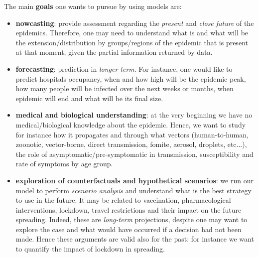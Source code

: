 \documentclass[../main/main.tex]{subfiles}
\begin{document}
The main \textbf{goals} one wants to pursue by using models are:
\begin{itemize}
    \item \textbf{nowcasting}: provide assessment regarding the \textit{present} and \textit{close future} of the epidemics. Therefore, one may need to understand what is and what will be the extension/distribution by groups/regions of the epidemic that is present at that moment, given the partial information returned by data.
    \item \textbf{forecasting}: prediction in \textit{longer term}. For instance, one would like to predict hospitals occupancy, when and how high will be the epidemic peak, how many people will be infected over the next weeks or months, when epidemic will end and what will be its final size.
    \item \textbf{medical and biological understanding}: at the very beginning we have no medical/biological knowledge about the epidemic. Hence, we want to study for instance how it propagates and through what vectors (human-to-human, zoonotic, vector-borne, direct transmission, fomite, aerosol, droplets, etc...), the role of asymptomatic/pre-symptomatic in transmission, susceptibility and rate of symptoms by age group.
    \item \textbf{exploration of counterfactuals and hypothetical scenarios}: we run our model to perform \textit{scenario analysis} and understand what is the best strategy to use in the future. It may be related to vaccination, pharmacological interventions, lockdown, travel restrictions and their impact on the future spreading. Indeed, these are \textit{long-term} projections, despite one may want to explore the case and what would have occurred if a decision had not been made. Hence these arguments are valid also for the past: for instance we want to quantify the impact of lockdown in spreading.
\end{itemize}
\end{document}
